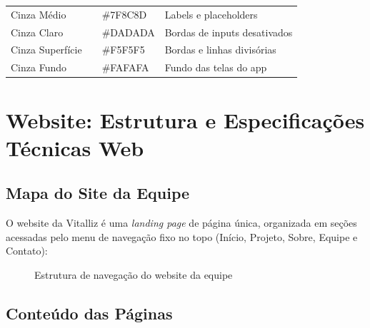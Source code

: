 \documentclass[11pt,a4paper]{article}
\begin{document}
\begin{table}[H]
\begin{tabular}{|l|c|l|l|}
Cinza Médio & \colorbox[HTML]{7F8C8D}{\phantom{AAA}} & \#7F8C8D & Labels e placeholders \\
Cinza Claro & \colorbox[HTML]{DADADA}{\phantom{AAA}} & \#DADADA & Bordas de inputs desativados \\
Cinza Superfície & \colorbox[HTML]{F5F5F5}{\phantom{AAA}} & \#F5F5F5 & Bordas e linhas divisórias \\
Cinza Fundo & \colorbox[HTML]{FAFAFA}{\phantom{AAA}} & \#FAFAFA & Fundo das telas do app \\
\hline
\end{tabular}
\end{table}

\section{Website: Estrutura e Especificações Técnicas Web}

\subsection{Mapa do Site da Equipe}

O website da Vitalliz é uma \textit{landing page} de página única, organizada em seções acessadas pelo menu de navegação fixo no topo (Início, Projeto, Sobre, Equipe e Contato):

\begin{figure}[H]
\centering
{}
\caption{Estrutura de navegação do website da equipe}
\label{fig:sitemap}
\end{figure}

\subsection{Conteúdo das Páginas}
\end{document}
